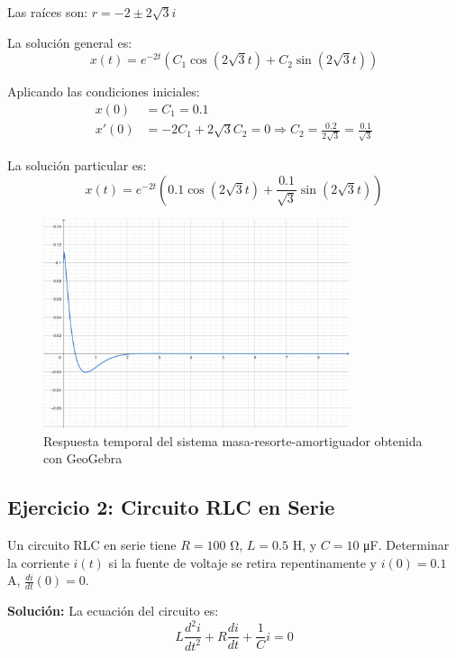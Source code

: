 \documentclass[12pt]{article}
\begin{document}
Las raíces son: $r = -2 \pm 2\sqrt{3}i$

La solución general es:
\begin{equation}
    x(t) = e^{-2t} (C_1 \cos(2\sqrt{3}t) + C_2 \sin(2\sqrt{3}t))
\end{equation}

Aplicando las condiciones iniciales:
\begin{align}
    x(0) &= C_1 = 0.1 \\
    x'(0) &= -2C_1 + 2\sqrt{3}C_2 = 0 \Rightarrow C_2 = \frac{0.2}{2\sqrt{3}} = \frac{0.1}{\sqrt{3}}
\end{align}

La solución particular es:
\begin{equation}
    x(t) = e^{-2t} \left(0.1 \cos(2\sqrt{3}t) + \frac{0.1}{\sqrt{3}} \sin(2\sqrt{3}t)\right)
\end{equation}

\begin{figure}[H]
    \centering
    \includegraphics[width=0.8\textwidth]{imagen-ejercicio1.png}
    \caption{Respuesta temporal del sistema masa-resorte-amortiguador obtenida con GeoGebra}
\end{figure}

\subsection{Ejercicio 2: Circuito RLC en Serie}

Un circuito RLC en serie tiene $R = 100$ Ω, $L = 0.5$ H, y $C = 10$ μF. Determinar la corriente $i(t)$ si la fuente de voltaje se retira repentinamente y $i(0) = 0.1$ A, $\frac{di}{dt}(0) = 0$.

\textbf{Solución:}
La ecuación del circuito es:
\begin{equation}
    L \frac{d^2 i}{dt^2} + R \frac{di}{dt} + \frac{1}{C} i = 0
\end{equation}
\end{document}
